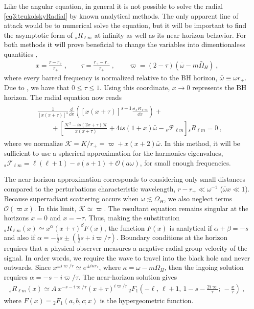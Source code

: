 Like the angular equation, in general it is not possible to solve the radial \eqref{eq3:teukolskyRadial} by known analytical methods.
The only apparent line of attack would be to numerical solve the equation, but it will be important to find the asymptotic form of ${}_{s}R_{\ell m}$ at infinity as well as its near-horizon behavior. 
For both methods it will prove beneficial to change the variables into dimentionaless quantities \cite{Rosa2016},
\begin{align}
    x = \frac{r - r_{+}}{r_{+}} ~,\qquad \tau = \frac{r_{+} - r_{-}}{r_{+}} ~,\qquad \varpi = (2-\tau)( \bar\omega - m \bar{\Omega}_H) ~,
\end{align}
where every barred frequency is normalized relative to the BH horizon, $\bar\omega\equiv\omega r_{+}$. Due to , we have that $0\le\tau\le 1$. Using this coordinate, $x\to0$ represents the BH horizon. The radial equation now reads
\begin{align}
    \label{eq3:radialTeukolskyAdimensional}
    \begin{split}
        & \frac{1}{[x(x+\tau)]^s} \frac{\dd}{\dd x}\left( [x(x+\tau)]^{s+1} \frac{\dd \,{}_{s}R_{\ell m}}{\dd x} \right) + \\
        &\qquad + \left[ \frac{\mathscr{K}^2 - i s (2 x+\tau) \mathscr{K}}{x(x+\tau)} + 4 i s (1 + x)\bar{\omega} - {}_{s}\mathscr{F}_{\ell m} \right] {}_{s}R_{\ell m} = 0 ~,
    \end{split}
\end{align}
where we normalize $\mathscr{K} = K/r_{+} = \varpi + x(x+2)\bar{\omega}$. In this method, it will be sufficient to use a spherical approximation for the harmonics eigenvalues, ${}_{s}\mathscr{F}_{\ell m} = \ell(\ell+1) - s(s+1) + \mathscr{O}(a\omega)$, for small enough frequencies.

The near-horizon approximation corresponds to considering only small distances compared to the perturbations characteristic wavelength, $r-r_{+} \ll \omega^{-1}$ ($\bar{\omega} x \ll 1$).
Because superradiant scattering occurs when $\omega\lesssim\Omega_H$, we also neglect terms $\mathscr{O}(\varpi x)$.
In this limit, $\mathscr{K}\simeq\varpi$.
The resultant equation remains singular at the horizons $x=0$ and $x=-\tau$. Thus, making the substitution ${}_{s}R_{\ell m}(x)\simeq x^\alpha (x+\tau)^\beta F(x)$, the function $F(x)$ is analytical if $\alpha+\beta=-s$ and also if $\alpha=-\tfrac{1}{2} s \pm \left(\tfrac{1}{2} s + i \varpi/\tau \right)$.
Boundary conditions at the horizon requires that a physical observer measures a negative radial group velocity of the signal.
In order words, we require the wave to travel into the black hole and never outwards.
Since $x^{\pm i \varpi/\tau} \simeq e^{\pm i \kappa r_{*}}$, where $\kappa=\omega - m \Omega_H$, then the ingoing solution requires $\alpha=-s-i\varpi/\tau$. The near-horizon solution gives
\begin{align}
    \label{eq3:RnearSolution}
    {}_{s}R_{\ell m}(x) \simeq A \, x^{-s-i\varpi/\tau} (x+\tau)^{i\varpi/\tau} \,{}_{2}F_1\left( -\ell, \,\ell+1, \,1-s-\frac{2i\varpi}{\tau}; \,-\frac{x}{\tau}\right) ~,
\end{align}
where $F(x)={}_{2}F_1(a,b,c; x)$ is the hypergeometric function.

